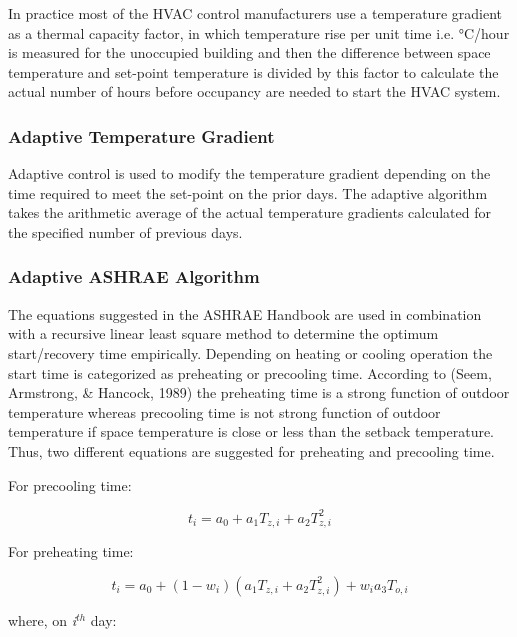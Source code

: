 In practice most of the HVAC control manufacturers use a temperature gradient as a thermal capacity factor, in which temperature rise per unit time i.e. °C/hour is measured for the unoccupied building and then the difference between space temperature and set-point temperature is divided by this factor to calculate the actual number of hours before occupancy are needed to start the HVAC system.

\subsubsection{Adaptive Temperature Gradient}\label{adaptive-temperature-gradient}

Adaptive control is used to modify the temperature gradient depending on the time required to meet the set-point on the prior days. The adaptive algorithm takes the arithmetic average of the actual temperature gradients calculated for the specified number of previous days.

\subsubsection{Adaptive ASHRAE Algorithm}\label{adaptive-ashrae-algorithm}

The equations suggested in the ASHRAE Handbook are used in combination with a recursive linear least square method to determine the optimum start/recovery time empirically. Depending on heating or cooling operation the start time is categorized as preheating or precooling time. According to (Seem, Armstrong, \& Hancock, 1989) the preheating time is a strong function of outdoor temperature whereas precooling time is not strong function of outdoor temperature if space temperature is close or less than the setback temperature. Thus, two different equations are suggested for preheating and precooling time.

For precooling time:

\begin{equation}
{t_i} = {a_0} + {a_1}{T_{z,i}} + {a_2}T_{z,i}^2
\end{equation}

For preheating time:

\begin{equation}
{t_i} = {a_0} + \left( {1 - {w_i}} \right)({a_1}{T_{z,i}} + {a_2}T_{z,i}^2) + {w_i}{a_3}{T_{o,i}}
\end{equation}

where, on \emph{i}\(^{th}\) day:

